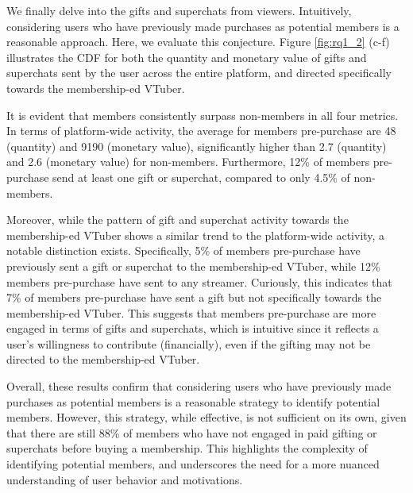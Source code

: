 We finally delve into the gifts and superchats from viewers. 
Intuitively, considering users who have previously made purchases as potential members is a reasonable approach. Here, we evaluate this conjecture.
Figure \ref{fig:rq1_2} (c-f) illustrates the CDF for both the quantity and monetary value of gifts and superchats sent by the user across the entire platform, and directed specifically towards the membership-ed VTuber. 

It is evident that members consistently surpass non-members in all four metrics.
In terms of platform-wide activity, the average for members pre-purchase are 48 (quantity) and 9190 (monetary value), significantly higher than 2.7 (quantity) and 2.6 (monetary value) for non-members. Furthermore, 12\% of members pre-purchase  send at least one gift or superchat, compared to only 4.5\% of non-members. 

Moreover, while the pattern of gift and superchat activity towards the membership-ed VTuber shows a similar trend to the platform-wide activity, a notable distinction exists. Specifically, 5\% of members pre-purchase have previously sent a gift or superchat to the membership-ed VTuber, while 12\% members pre-purchase have sent to any streamer. Curiously, this indicates that 7\% of members pre-purchase have sent a gift but not specifically towards the membership-ed VTuber. 
This suggests that members pre-purchase are more engaged in terms of gifts and superchats, which is intuitive since it reflects a user's willingness to contribute (financially), even if the gifting may not be directed to the membership-ed VTuber.


Overall, these results confirm that considering users who have previously made purchases as potential members is a reasonable strategy to identify potential members. However, this strategy, while effective, is not sufficient on its own, given that there are still 88\% of members who have not engaged in paid gifting or superchats before buying a membership. This highlights the complexity of identifying potential members, and underscores the need for a more nuanced understanding of user behavior and motivations.






























